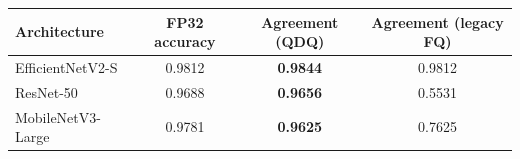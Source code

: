 \begin{tabular}{lccc}
\toprule
\textbf{Architecture} & \textbf{FP32 accuracy} & \textbf{Agreement (QDQ)} & \textbf{Agreement (legacy FQ)} \\
\midrule
EfficientNetV2-S  & 0.9812 & \textbf{0.9844} & 0.9812 \\
ResNet-50         & 0.9688 & \textbf{0.9656} & 0.5531 \\
MobileNetV3-Large & 0.9781 & \textbf{0.9625} & 0.7625 \\
\bottomrule
\end{tabular}
